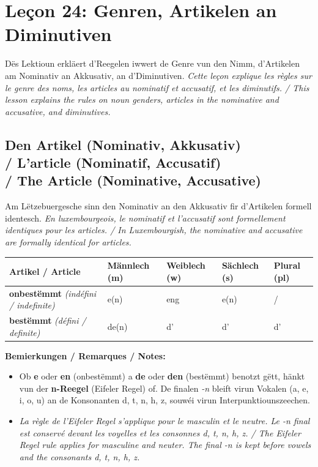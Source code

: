 \chapter{Leçon 24: Genren, Artikelen an Diminutiven}

Dës Lektioun erkläert d'Reegelen iwwert de Genre vun den Nimm, d'Artikelen am Nominativ an Akkusativ, an d'Diminutiven. \textit{Cette leçon explique les règles sur le genre des noms, les articles au nominatif et accusatif, et les diminutifs. / This lesson explains the rules on noun genders, articles in the nominative and accusative, and diminutives.}

\vspace{1em}

\section[Den Artikel / L'Article / The Article]{Den Artikel (Nominativ, Akkusativ) \\/ L'article (Nominatif, Accusatif) \\/ The Article (Nominative, Accusative)}

Am Lëtzebuergesche sinn den Nominativ an den Akkusativ fir d'Artikelen formell identesch. \textit{En luxembourgeois, le nominatif et l'accusatif sont formellement identiques pour les articles. / In Luxembourgish, the nominative and accusative are formally identical for articles.}

\vspace{0.5em}

\begin{tabular}{lllll}
    \toprule
    \textbf{Artikel / Article} & \textbf{Männlech (m)} & \textbf{Weiblech (w)} & \textbf{Sächlech (s)} & \textbf{Plural (pl)} \\
    \midrule
    \textbf{onbestëmmt} \textit{(indéfini / indefinite)} & e(n) & eng & e(n) & / \\
    \textbf{bestëmmt} \textit{(défini / definite)} & de(n) & d' & d' & d' \\
    \bottomrule
\end{tabular}

\vspace{1em}

\textbf{Bemierkungen / Remarques / Notes:}
\begin{itemize}
    \item Ob \textbf{e} oder \textbf{en} (onbestëmmt) a \textbf{de} oder \textbf{den} (bestëmmt) benotzt gëtt, hänkt vun der \textbf{n-Reegel} (Eifeler Regel) of. De finalen \textit{-n} bleift virun Vokalen (a, e, i, o, u) an de Konsonanten d, t, n, h, z, souwéi virun Interpunktiounszeechen.
    \item \textit{La règle de l'Eifeler Regel s'applique pour le masculin et le neutre. Le -n final est conservé devant les voyelles et les consonnes d, t, n, h, z. / The Eifeler Regel rule applies for masculine and neuter. The final -n is kept before vowels and the consonants d, t, n, h, z.}
\end{itemize}

